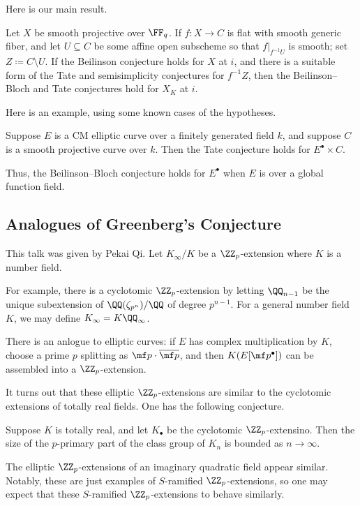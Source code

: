 \documentclass{article}
\begin{document}
Here is our main result.
\begin{theorem}
	Let $X$ be smooth projective over $\FF_q$. If $f\colon X\to C$ is flat with smooth generic fiber, and let $U\subseteq C$ be some affine open subscheme so that $f|_{f^{-1}U}$ is smooth; set $Z\coloneqq C\setminus U$. If the Beilinson conjecture holds for $X$ at $i$, and there is a suitable form of the Tate and semisimplicity conjectures for $f^{-1}Z$, then the Beilinson--Bloch and Tate conjectures hold for $X_K$ at $i$.
\end{theorem}
Here is an example, using some known cases of the hypotheses.
\begin{theorem}
	Suppose $E$ is a CM elliptic curve over a finitely generated field $k$, and suppose $C$ is a smooth projective curve over $k$. Then the Tate conjecture holds for $E^\bullet\times C$.
\end{theorem}
\begin{remark}
	Thus, the Beilinson--Bloch conjecture holds for $E^\bullet$ when $E$ is over a global function field.
\end{remark}

\subsection{Analogues of Greenberg's Conjecture}
This talk was given by Pekai Qi. Let $K_\infty/K$ be a $\ZZ_p$-extension where $K$ is a number field.
\begin{example}[cyclotomic]
	For example, there is a cyclotomic $\ZZ_p$-extension by letting $\QQ_{n-1}$ be the unique subextension of $\QQ(\zeta_{p^n})/\QQ$ of degree $p^{n-1}$. For a general number field $K$, we may define $K_\infty=K\QQ_\infty$.
\end{example}
\begin{example}[elliptic]
	There is an anlogue to elliptic curves: if $E$ has complex multiplication by $K$, choose a prime $p$ splitting as $\mf p\cdot\overline{\mf p}$, and then $K(E[\mf p^\bullet])$ can be assembled into a $\ZZ_p$-extension.
\end{example}
It turns out that these elliptic $\ZZ_p$-extensions are similar to the cyclotomic extensions of totally real fields. One has the following conjecture.
\begin{conj}[Greenberg]
	Suppose $K$ is totally real, and let $K_\bullet$ be the cyclotomic $\ZZ_p$-extensino. Then the size of the $p$-primary part of the class group of $K_n$ is bounded as $n\to\infty$. 
\end{conj}
The elliptic $\ZZ_p$-extensions of an imaginary quadratic field appear similar. Notably, these are just examples of $S$-ramified $\ZZ_p$-extensions, so one may expect that these $S$-ramified $\ZZ_p$-extensions to behave similarly.
\end{document}
